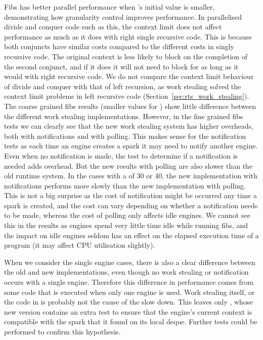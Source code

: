 

Fibs has better parallel performance when \Depth's initial value is
smaller,
demonstrating how granularity control improves performance.
In parallelised divide and conquer code such as this,
the context limit does not affect performance as much as it does with right
single recursive code.
This is because both conjuncts have similar costs compared to the different
costs in singly recursive code.
The original context is less likely to block on the completion of the second
conjunct,
and if it does it will not need to block for as long as it would
with right recursive code.
We do not compare the context limit behaviour of divide and conquer with that
of left recursion,
as work stealing solved the context limit problems in left recursive code
(Section~\ref{sec:rts_work_stealing}).
The coarse grained fibs results (smaller values for \Depth)
show little difference between the different work stealing implementations.
However,
in the fine grained fibs tests we can clearly see that the new work stealing
system has higher overheads,
both with notifications and with polling.
This makes sense for the notification tests
as each time an engine creates a spark it may need to notify another
engine.
Even when no notification is made,
the test to determine if a notification is needed adds overhead.
But the new results with polling are also slower than the old runtime
system.
In the cases with a  of 30 or 40,
the new implementation with notifications performs more slowly than the new
implementation with polling.
This is not a big surprise as the cost of notification might be occurred any
time a spark is created,
and the cost can vary depending on whether a notification needs to be made,
whereas the cost of polling only affects idle engines.
We cannot see this in the results as engines spend very little time idle
while running fibs,
and the impact on idle engines seldom has an effect on the elapsed execution
time of a program (it may affect CPU utilisation slightly).

When we consider the single engine cases,
there is also a clear difference between the old and new implementations,
even though no work stealing or notification occurs with a single engine.
Therefore this difference in performance comes from some code that is
executed when only one engine is used.
Work stealing itself, or the code in \idle is probably not the cause of the
slow down.
This leaves only \joinandcontinue,
whose new version contains an extra test to ensure that the engine's current
context is compatible with the spark that it found on its local deque.
Further tests could be performed to confirm this hypothesis.

